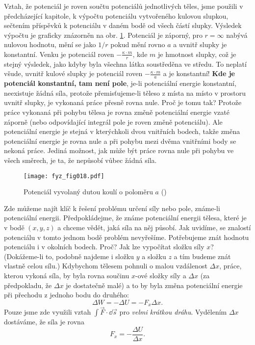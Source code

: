 {    Vztah, že potenciál je roven součtu potenciálů jednotlivých těles, jsme použili v předcházející 
    kapitole, k výpočtu potenciálu vytvořeného kulovou slupkou, sečtením příspěvků k 
    potenciálu v daném bodě od všech částí slupky. Výsledek výpočtu je graficky znázorněn na obr. 
    \ref{fyz:fig018}. Potenciál je záporný, pro \(r=\infty\) nabývá nulovou hodnotu, mění se jako 
    \(1/r\) pokud mění rovno \(a\) a uvnitř slupky je konstantní. Venku je potenciál roven 
    \(-\frac{\kappa\cdot m}{r}\), kde \(m\) je hmotnost slupky, což je stejný výsledek, jako kdyby 
    byla všechna látka soustředěna ve středu. To neplatí všude, uvnitř kulové slupky je potenciál 
    roven \(-\frac{\kappa\cdot m}{a}\) a je konstantní! \textbf{Kde je potenciál konstantní, tam 
    není pole}, je-li potenciální energie konstantní, neexistuje žádná síla, protože 
    přemisťujeme-li těleso z místa na místo v prostoru uvnitř slupky, je vykonaná práce přesně 
    rovna nule. Proč je tomu tak? Protože práce vykonaná při pohybu tělesa je rovna změně 
    potenciální energie vzaté záporně (nebo odpovídající integrál pole je roven změně potenciálu). 
    Ale potenciální energie je stejná v kterýchkoli dvou vnitřních bodech, takže změna potenciální 
    energie je rovna nule a při pohybu mezi dvěma vnitřními body se nekoná práce. Jediná možnost, 
    jak může být práce rovna nule při pohybu ve všech směrech, je ta, že nepůsobí vůbec žádná síla.
    
    \begin{figure}[ht!]  %
      \centering
      \texttt{[image: fyz\_fig018.pdf]}
      \caption{Potenciál vyvolaný dutou koulí o poloměru \(a\) (\cite[s.~205]{Feynman01})}
      \label{fyz:fig018}
    \end{figure}    
    Zde můžeme najít klíč k řešení problému určení síly nebo pole, známe-li potenciální energii. 
    Předpokládejme, že známe potenciální energii tělesa, které je v bodě \((x, y, z)\) a chceme 
    vědět, jaká síla na něj působí. Jak uvidíme, se znalostí potenciálu v tomto jednom bodě problém 
    nevyřešíme. Potřebujeme znát hodnotu potenciálu i v okolních bodech. Proč? Jak lze vypočítat 
    složku síly \(x\)? (Dokážeme-li to, podobně najdeme i složku \(y\) a složku \(z\) a tím budeme 
    znát vlastně celou sílu.) Kdybychom tělesem pohnuli o malou vzdálenost \(\Delta x\), práce, 
    kterou vykoná síla, by byla rovna součinu \(x\)-ové složky síly a \(\Delta x\) (za předpokladu, 
    že \(\Delta x\) je dostatečně malé) a to by byla změna potenciální energie při přechodu z 
    jednoho bodu do druhého:
    \begin{equation}\label{FYZ:eq004}
      \Delta W = - \Delta U = - F_x\Delta x.
    \end{equation}
    Pouze jsme zde využili vztah \(\int\vec{F}\cdot\dd{\vec{s}}\) pro \emph{velmi krátkou dráhu}. 
    Vydělením \(\Delta x\) dostáváme, že síla je rovna
    \begin{equation}\label{FYZ:eq005}
      F_x = -\frac{\Delta U}{\Delta x}.
    \end{equation}
    
}
